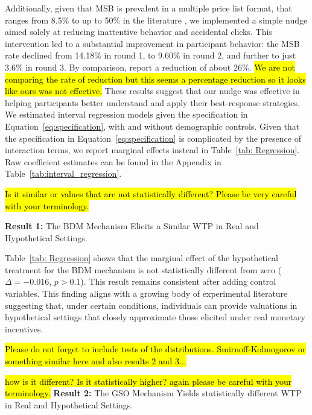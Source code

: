 \documentclass[12pt]{article}
\begin{document}
Additionally, given that MSB is prevalent in a multiple price list format, that ranges from 8.5\%  to up to 50\% in the literature \citep{yu2021multiple, filippin2016reconsideration}, we implemented a simple nudge aimed solely at reducing inattentive behavior and accidental clicks. This intervention led to a substantial improvement in participant behavior: the MSB rate declined from 14.18\% in round 1, to 9.60\% in round 2, and further to just 3.6\% in round 3. By comparison, \citet{yu2021multiple} report a reduction of about 26\%. \hl{We are not comparing the rate of reduction but this seems a percentage reduction so it looks like ours was not effective.}
These results suggest that our nudge was effective in helping participants better understand and apply their best-response strategies. We estimated interval regression models given the specification in Equation~\ref{eq:specification}, with and without demographic controls. Given that the specification in Equation~\ref{eq:specification} is complicated by the presence of interaction terms, we report marginal effects instead in Table~\ref{tab: Regression}. Raw coefficient estimates can be found in the Appendix in Table~\ref{tab:interval_regression}.

\hl{Is it similar or values that are not statistically different? Please be very careful with your terminology.}

\textbf{Result 1:} The BDM Mechanism Elicits a Similar WTP in Real and Hypothetical Settings. 

Table~\ref{tab: Regression} shows that the marginal effect of the hypothetical treatment for the BDM mechanism is not statistically different from zero (\(\Delta = -0.016\), \(p > 0.1\)). This result remains consistent after adding control variables. This finding aligns with a growing body of experimental literature suggesting that, under certain conditions, individuals can provide valuations in hypothetical settings that closely approximate those elicited under real monetary incentives\citep{branas-garza_paid_2023, drichoutis_incentives_2025}. 

 \hl{Please do not forget to include tests of the distributions. Smirnoff-Kolmogorov or something similar here and also results 2 and 3...}
 
\vspace{0.5cm}

\hl{how is it different? Is it statistically higher? again please be careful with your terminology.}
\textbf{Result 2:} The GSO Mechanism Yields statistically different WTP in Real and Hypothetical Settings. 
\end{document}
